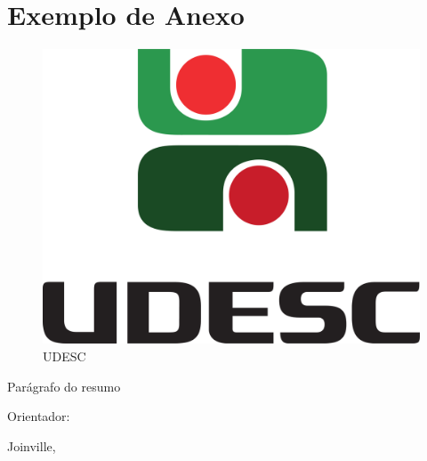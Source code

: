 \documentclass[a4paper,12pt]{udesc}
\begin{document}
\anexo

\chapter{Exemplo de Anexo}

\begin{figure}

\caption{UDESC}
\centering 
\includegraphics[scale=0.04]{fig/Marca_UDESC_vertical.pdf}

\end{figure}


\pagebreak


\clearpage


\newpage

\thispagestyle{empty}
Parágrafo do resumo
\vspace{.5cm}

\centering Orientador: \orientadordata

\vfill

Joinville, \anodata
\end{document}
